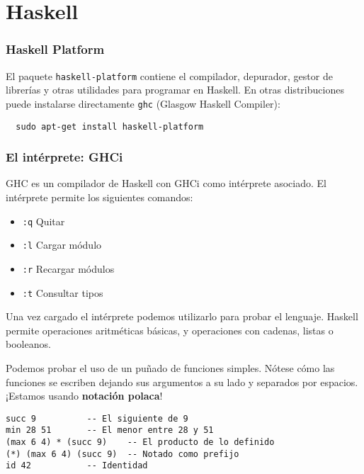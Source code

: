 \section{Haskell}
\begin{frame}[fragile]
  \frametitle{Haskell Platform}
  El paquete \texttt{haskell-platform} contiene el compilador, depurador, gestor de 
  librerías y otras utilidades para programar en Haskell.
  En otras distribuciones puede instalarse directamente \texttt{ghc} 
  (Glasgow Haskell Compiler):
  \begin{lstlisting}
  sudo apt-get install haskell-platform
  \end{lstlisting}
\end{frame}

\begin{frame}
  \frametitle{El intérprete: GHCi}
  GHC es un compilador de Haskell con GHCi como intérprete asociado. 
  El intérprete permite los siguientes comandos:
  \begin{itemize}
    \item \texttt{:q} \qquad  Quitar
    \item \texttt{:l} \qquad  Cargar módulo
    \item \texttt{:r} \qquad  Recargar módulos
    \item \texttt{:t} \qquad  Consultar tipos
  \end{itemize}
  
  Una vez cargado el intérprete podemos utilizarlo para probar el lenguaje.
  Haskell permite operaciones aritméticas básicas, y operaciones con
  cadenas, listas o booleanos.
\end{frame}

\begin{frame}[fragile]
  Podemos probar el uso de un puñado de funciones simples. Nótese cómo las funciones
  se escriben dejando sus argumentos a su lado y separados por espacios. ¡Estamos usando
  \textbf{notación polaca}!
  
\begin{lstlisting}
succ 9			-- El siguiente de 9
min 28 51		-- El menor entre 28 y 51
(max 6 4) * (succ 9)	-- El producto de lo definido
(*) (max 6 4) (succ 9)	-- Notado como prefijo
id 42			-- Identidad
\end{lstlisting}
\end{frame}